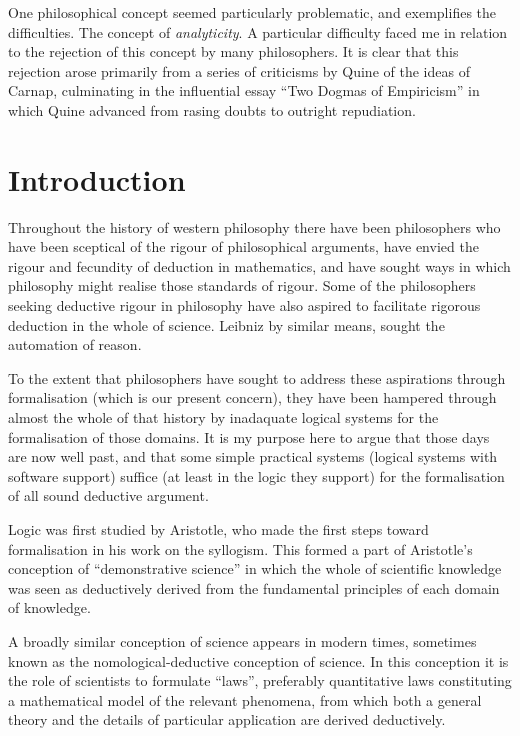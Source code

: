 \documentclass[10pt,titlepage]{book}
\begin{document}
One philosophical concept seemed particularly problematic, and exemplifies the difficulties.
The concept of {\it analyticity}.
A particular difficulty faced me in relation to the rejection of this concept by many philosophers.
It is clear that this rejection arose primarily from a series of criticisms by Quine of the ideas of Carnap, culminating in the influential essay ``Two Dogmas of Empiricism'' in which Quine advanced from rasing doubts to outright repudiation.

\chapter{Introduction}

Throughout the history of western philosophy there have been philosophers who have been sceptical of the rigour of philosophical arguments, have envied the rigour and fecundity of deduction in mathematics, and have sought ways in which philosophy might realise those standards of rigour.
Some of the philosophers seeking deductive rigour in philosophy have also aspired to facilitate rigorous deduction in the whole of science.
Leibniz by similar means, sought the automation of reason.

To the extent that philosophers have sought to address these aspirations through formalisation (which is our present concern), they have been hampered through almost the whole of that history by inadaquate logical systems for the formalisation of those domains.
It is my purpose here to argue that those days are now well past, and that some simple practical systems (logical systems with software support) suffice (at least in the logic they support) for the formalisation of all sound deductive argument.

Logic was first studied by Aristotle, who made the first steps toward formalisation in his work on the syllogism.
This formed a part of Aristotle's conception of ``demonstrative science'' in which the whole of scientific knowledge was seen as deductively derived from the fundamental principles of each domain of knowledge.

A broadly similar conception of science appears in modern times, sometimes known as the nomological-deductive conception of science.
In this conception it is the role of scientists to formulate ``laws'', preferably quantitative laws constituting a mathematical model of the relevant phenomena, from which both a general theory and the details of particular application are derived deductively.
\end{document}
